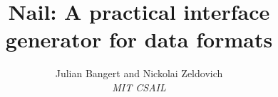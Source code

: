 \documentclass[10pt,twocolumn]{article}
\begin{document}
\author{Julian Bangert and Nickolai Zeldovich \\ \em MIT CSAIL}
\date{}
\title{Nail: A practical interface generator for data formats}

\maketitle













\end{document}
